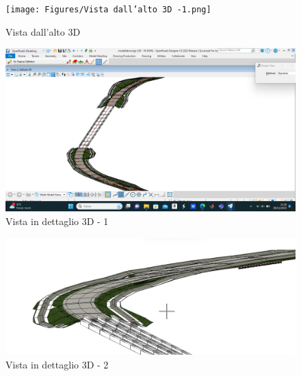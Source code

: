 \begin{figure}[H]
    \texttt{[image: Figures/Vista dall’alto 3D -1.png]}
      \caption{Vista dall’alto 3D}
      \label{Vista dall’alto 3D}
\end{figure}

\begin{figure}[H]
    \includegraphics[width=\textwidth]{Figures/Vista in dettaglio 3D - 1.png}
      \caption{Vista in dettaglio 3D - 1}
      \label{Vista in dettaglio 3D - 1}
\end{figure}

\begin{figure}[H]
    \includegraphics[width=\textwidth]{Figures/Vista in dettaglio 3D - 2.png}
      \caption{Vista in dettaglio 3D - 2}
      \label{Vista in dettaglio 3D - 2}
\end{figure}